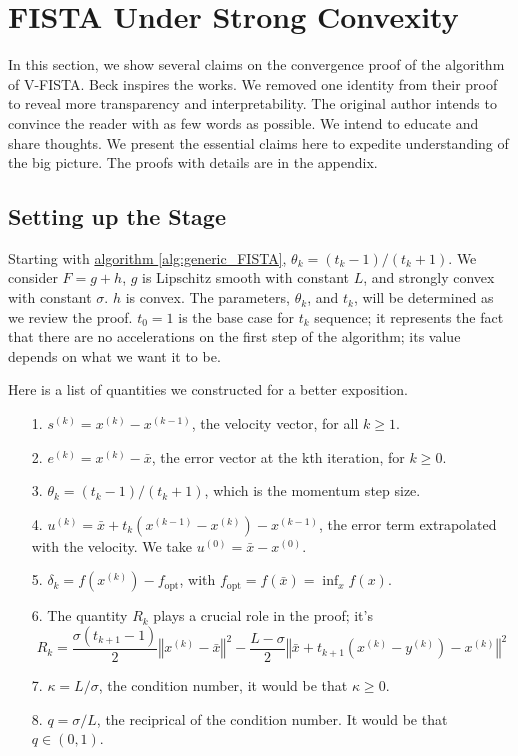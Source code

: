 \documentclass[]{article}
\theoremstyle{definition}
\numberwithin{equation}{subsection}
\begin{document}
\section{FISTA Under Strong Convexity}\label{sec:fista_strong_convexity}
    In this section, we show several claims on the convergence proof of the algorithm of V-FISTA. 
    Beck \cite[10.7.7]{beck_first-order_nodate} inspires the works. 
    We removed one identity from their proof to reveal more transparency and interpretability. 
    The original author intends to convince the reader with as few words as possible. 
    We intend to educate and share thoughts. 
    We present the essential claims here to expedite understanding of the big picture. 
    The proofs with details are in the appendix. 
    \subsection{Setting up the Stage}
        Starting with \hyperref[alg:generic_FISTA]{algorithm \ref*{alg:generic_FISTA}}, $\theta_k = (t_k - 1)/(t_k + 1)$. 
        We consider $F = g + h$, $g$ is Lipschitz smooth with constant $L$, and strongly convex with constant $\sigma$. 
        $h$ is convex. 
        The parameters, $\theta_k$, and $t_k$, will be determined as we review the proof. 
        $t_{0} = 1$ is the base case for $t_k$ sequence; it represents the fact that there are no accelerations on the first step of the algorithm; its value depends on what we want it to be. 
        \par
        Here is a list of quantities we constructed for a better exposition. 
        \begin{itemize}
            \item [1.] $s^{(k)} = x^{(k)} - x^{(k - 1)}$, the velocity vector,
            for all $k\ge 1$. 
            \item [2.] $e^{(k)} = x^{(k)} - \bar x$, the error vector at the kth iteration, for $k \ge 0$. 
            \item [3.] $\theta_k = (t_k -1)/(t_k + 1)$, which is the momentum step size. 
            \item [4.] $u^{(k)} = \bar x + t_{k}(x^{(k - 1)} - x^{(k)}) - x^{(k - 1)}$, the error term extrapolated with the velocity. We take $u^{(0)} = \bar x - x^{(0)}$. 
            \item [5.] $\delta_k = f(x^{(k)}) - f_{\text{opt}}$, with $f_{\text{opt}} = f(\bar x) = \inf_x f(x)$. 
            \item [6.] The quantity $R_k$ plays a crucial role in the proof; it's
            $$
                R_k = 
                \frac{\sigma(t_{k + 1} - 1)}{2}
                \left\Vert
                    x^{(k)} - \bar x
                \right\Vert^2 
                - 
                \frac{L - \sigma}{2}
                \left\Vert
                    \bar x + t_{k + 1}\left( x^{(k)} - y^{(k)}\right) - x^{(k)}
                \right\Vert^2
            $$
            \item [7.] $\kappa = L/\sigma$, the condition number, it would be that $\kappa \ge 0$. 
            \item [8.] $q = \sigma/L$, the reciprical of the condition number. It would be that $q \in (0, 1)$. 
        \end{itemize}
\end{document}

